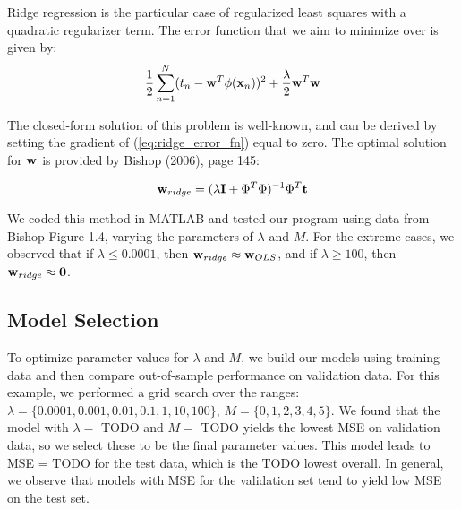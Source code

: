 Ridge regression is the particular case of regularized least squares with a quadratic regularizer term.  The error function that we aim to minimize over is given by:
\begin{equation} \label{eq:ridge_error_fn}
\frac{1}{2} \sum_{n=1}^{N} (t_n - \boldsymbol{\mathbf{w}}^T \phi (\boldsymbol{\mathbf{x}}_n) )^2 + \frac{\lambda}{2} \boldsymbol{\mathbf{w}}^T \boldsymbol{\mathbf{w}}
\end{equation}

The closed-form solution of this problem is well-known, and can be derived by setting the gradient of (\ref{eq:ridge_error_fn}) equal to zero.  The optimal solution for $\boldsymbol{\mathbf{w}}$ is provided by Bishop (2006), page 145:

\begin{equation} \label{eq:ridge_sol}
\boldsymbol{\mathbf{w}}_{ridge} = (\lambda \boldsymbol{\mathbf{I}} + \Phi^T \Phi)^{-1} \Phi^T \boldsymbol{\mathbf{t}}
\end{equation}

We coded this method in MATLAB and tested our program using data from Bishop Figure 1.4, varying the parameters of $\lambda$ and $M$.  For the extreme cases, we observed that if $\lambda \leq 0.0001$, then $\boldsymbol{\mathbf{w}}_{ridge} \approx \boldsymbol{\mathbf{w}}_{OLS}$, and if $\lambda \geq 100$, then $\boldsymbol{\mathbf{w}}_{ridge} \approx \boldsymbol{\mathbf{0}}$.



\subsection{Model Selection}
To optimize parameter values for $\lambda$ and $M$, we build our models using training data and then compare out-of-sample performance on validation data.  For this example, we performed a grid search over the ranges: $\lambda = \{0.0001, 0.001, 0.01, 0.1,1,10,100\}$, $M = \{0,1,2,3,4,5\}$.  We found that the model with $\lambda = $ TODO and $M = $ TODO yields the lowest MSE on validation data, so we select these to be the final parameter values.  This model leads to MSE = TODO for the test data, which is the TODO lowest overall.  In general, we observe that models with MSE for the validation set tend to yield low MSE on the test set.  

